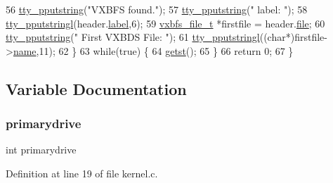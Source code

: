 \begin{DoxyCode}
56         \hyperlink{a00140_ade960b1320324706aac6c00cc6b1b2fe_ade960b1320324706aac6c00cc6b1b2fe}{tty\_pputstring}(\textcolor{stringliteral}{"VXBFS found."});
57         \hyperlink{a00140_ade960b1320324706aac6c00cc6b1b2fe_ade960b1320324706aac6c00cc6b1b2fe}{tty\_pputstring}(\textcolor{stringliteral}{" label: "});
58         \hyperlink{a00140_abaf93f9e56ddb7b10462070f59e534e4_abaf93f9e56ddb7b10462070f59e534e4}{tty\_pputstringl}(header.\hyperlink{a00266_af3cd6b4358b6ba93a7bd541c09c959c8_af3cd6b4358b6ba93a7bd541c09c959c8}{label},6);
59         \hyperlink{a00262}{vxbfs\_file\_t} *firstfile = header.\hyperlink{a00266_a3b903de5c5034494530cdc0c2d4ff9b1_a3b903de5c5034494530cdc0c2d4ff9b1}{file};
60         \hyperlink{a00140_ade960b1320324706aac6c00cc6b1b2fe_ade960b1320324706aac6c00cc6b1b2fe}{tty\_pputstring}(\textcolor{stringliteral}{" First VXBDS File: "});
61         \hyperlink{a00140_abaf93f9e56ddb7b10462070f59e534e4_abaf93f9e56ddb7b10462070f59e534e4}{tty\_pputstringl}((\textcolor{keywordtype}{char}*)firstfile->\hyperlink{a00262_a07ecc9bacdc2943442f26f62f6749055_a07ecc9bacdc2943442f26f62f6749055}{name},11);
62     \}
63     \textcolor{keywordflow}{while}(\textcolor{keyword}{true}) \{
64         \hyperlink{a00029_ab88a2e96bbe585e228a5b201435c0240_ab88a2e96bbe585e228a5b201435c0240}{getst}();
65     \}
66     \textcolor{keywordflow}{return} 0;
67 \}
\end{DoxyCode}


\subsection{Variable Documentation}
\mbox{\label{a00047_af37cb131d8a2101addfbf5fb2d8a53b4_af37cb131d8a2101addfbf5fb2d8a53b4}} 
\subsubsection{\texorpdfstring{primarydrive}{primarydrive}}
{\footnotesize\ttfamily int primarydrive}



Definition at line 19 of file kernel.\+c.

\mbox{\label{a00047_a2125beec541d04796805161dbec05fcf_a2125beec541d04796805161dbec05fcf}} 
